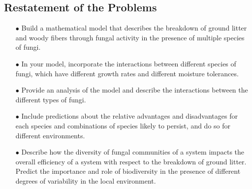 \subsection{Restatement of the Problems}
\begin{itemize}
\item[$\bullet$] Build a mathematical model that describes the breakdown of ground litter and woody fibers through fungal activity in the presence of multiple species of fungi.
\item[$\bullet$] In your model, incorporate the interactions between different species of fungi, which have different growth rates and different moisture tolerances.

\item[$\bullet$] Provide an analysis of the model and describe the interactions between the different types of fungi. 

\item[$\bullet$] Include predictions about the relative advantages and disadvantages for each species and combinations of species likely to persist, and do so for different environments.

\item[$\bullet$] Describe how the diversity of fungal communities of a system impacts the overall efficiency of a system with respect to the breakdown of ground litter. Predict the importance and role of biodiversity in the presence of different degrees of variability in the local environment.
\end{itemize}




